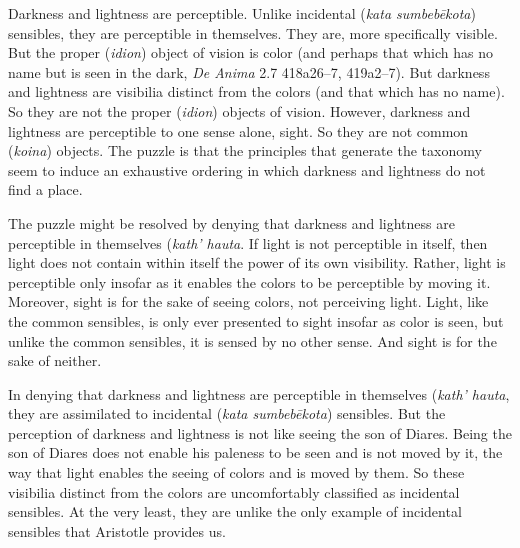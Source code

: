 Darkness and lightness are perceptible. Unlike incidental (\emph{kata sumbebēkota}) sensibles, they are perceptible in themselves. They are, more specifically visible. But the proper (\emph{idion}) object of vision is color (and perhaps that which has no name but is seen in the dark, \emph{De Anima} 2.7 418a26–7, 419a2–7). But darkness and lightness are visibilia distinct from the colors (and that which has no name). So they are not the proper (\emph{idion}) objects of vision. However, darkness and lightness are perceptible to one sense alone, sight. So they are not common (\emph{koina}) objects. The puzzle is that the principles that generate the taxonomy seem to induce an exhaustive ordering in which darkness and lightness do not find a place. 

The puzzle might be resolved by denying that darkness and lightness are perceptible in themselves (\emph{kath' hauta}. If light is not perceptible in itself, then light does not contain within itself the power of its own visibility. Rather, light is perceptible only insofar as it enables the colors to be perceptible by moving it. Moreover, sight is for the sake of seeing colors, not perceiving light. Light, like the common sensibles, is only ever presented to sight insofar as color is seen, but unlike the common sensibles, it is sensed by no other sense. And sight is for the sake of neither.

In denying that darkness and lightness are perceptible in themselves (\emph{kath' hauta}, they are assimilated to incidental (\emph{kata sumbebēkota}) sensibles. But the perception of darkness and lightness is not like seeing the son of Diares. Being the son of Diares does not enable his paleness to be seen and is not moved by it, the way that light enables the seeing of colors and is moved by them. So these visibilia distinct from the colors are uncomfortably classified as incidental sensibles. At the very least, they are unlike the only example of incidental sensibles that Aristotle provides us.

